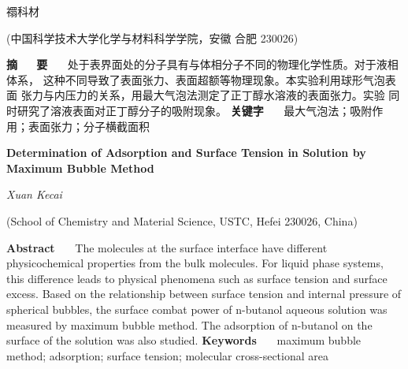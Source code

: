 \documentclass[12pt]{ctexart}
\numberwithin{equation}{section}
\begin{document}
\nocite{*}

\begin{center}
    \heiti {}

    \vspace{12pt}

    \kaishu \fontsize{13.75pt}{0}禤科材


    \vspace{5pt}

    \songti \fontsize{12pt}{0}(中国科学技术大学化学与材料科学学院，安徽 合肥 230026)
\end{center}

\noindent\textbf{摘~~~\!要}~~~\!
处于表界面处的分子具有与体相分子不同的物理化学性质。对于液相体系，
这种不同导致了表面张力、表面超额等物理现象。本实验利用球形气泡表面
张力与内压力的关系，用最大气泡法测定了正丁醇水溶液的表面张力。实验
同时研究了溶液表面对正丁醇分子的吸附现象。
\newline
\textbf{关键字}~~~\!
最大气泡法；吸附作用；表面张力；分子横截面积

\begin{center}
    {\LARGE\rmfamily\textbf{Determination of Adsorption and Surface Tension in Solution by Maximum Bubble Method}}

    \vspace{12pt}

    {\slshape Xuan Kecai}

    \vspace{5pt}

    (School of Chemistry and Material Science, USTC, Hefei 230026, China)
\end{center}

\noindent\textbf{Abstract}~~~\!
The molecules at the surface interface have different
physicochemical properties from the bulk molecules. For
liquid phase systems, this difference leads to physical
phenomena such as surface tension and surface excess. Based
on the relationship between surface tension and internal
pressure of spherical bubbles, the surface combat power of
n-butanol aqueous solution was measured by maximum bubble
method. The adsorption of n-butanol on the surface of the
solution was also studied.
\newline
\textbf{Keywords}~~~\!
maximum bubble method; adsorption; surface tension;
molecular cross-sectional area
\end{document}
